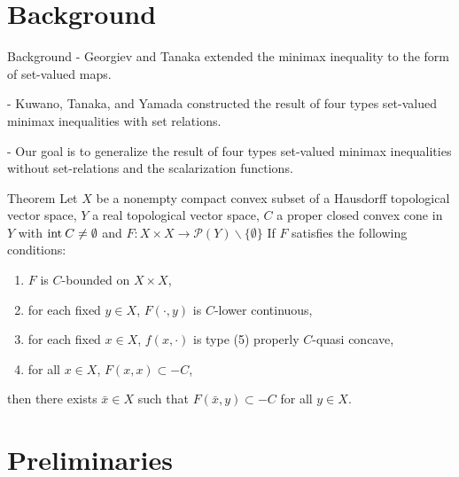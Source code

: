 \documentclass[aspectratio=169, dvipdfmx, 11pt]{beamer}
\newcommand{\Interior}[1]{\text{\rm int\:${#1}$}} %
\begin{document}
\section{Background}

\begin{frame}{Background}
  - Georgiev and Tanaka \cite{MR1807037} extended the minimax inequality to the form of set-valued maps.

  - Kuwano, Tanaka, and Yamada \cite{MR2778674} constructed the result of four types set-valued minimax inequalities
  with set relations.

  - Our goal is to generalize the result of four types set-valued minimax inequalities without set-relations and the scalarization functions.
\end{frame}

\begin{frame}
  \begin{block}{Theorem \cite{MR2778674}}
    Let $X$ be a nonempty compact convex subset of a Hausdorff topological vector space,
    $Y$ a real topological vector space, $C$ a proper closed convex cone in $Y$ with $\Interior{C} \ne \emptyset$
    and $F\colon X \times X \to \mathcal{P}(Y) \backslash \{\emptyset\}$ If $F$ satisfies the following conditions:
    \begin{enumerate}
      \item $F$ is $C$-bounded on $X \times X$,
      \item for each fixed $y \in X$, $F(\cdot,y)$ is $C$-lower continuous,
      \item for each fixed $x \in X$, $f(x, \cdot)$ is type (5) properly $C$-quasi concave,
      \item for all $x \in X$, $F(x,x) \subset -C$,
    \end{enumerate}
    then there exists $\bar{x} \in X$ such that $F(\bar{x},y) \subset -C$ for all $y \in X$.
  \end{block}
\end{frame}

\section{Preliminaries}
\end{document}
